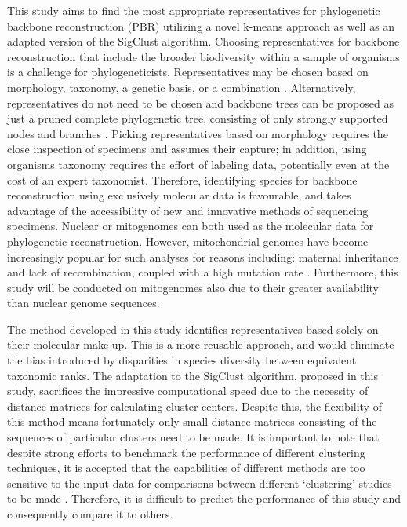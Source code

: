 \documentclass[12pt]{article}
\begin{document}
  This study aims to find the most appropriate representatives for phylogenetic backbone reconstruction (PBR) utilizing a novel k-means approach as well as an adapted version of the SigClust algorithm. Choosing representatives for backbone reconstruction that include the broader biodiversity within a sample of organisms is a challenge for phylogeneticists. Representatives may be chosen based on morphology, taxonomy, a genetic basis, or a combination \cite{orlov}. Alternatively, representatives do not need to be chosen and backbone trees can be proposed as just a pruned complete phylogenetic tree, consisting of only strongly supported nodes and branches \cite{creedy2024}. Picking representatives based on morphology requires the close inspection of specimens and assumes their capture; in addition, using organisms taxonomy requires the effort of labeling data, potentially even at the cost of an expert taxonomist. Therefore, identifying species for backbone reconstruction using exclusively molecular data is favourable, and takes advantage of the accessibility of new and innovative methods of sequencing specimens. Nuclear or mitogenomes can both used as the molecular data for phylogenetic reconstruction. However, mitochondrial genomes have become increasingly popular for such analyses for reasons including: maternal inheritance and lack of recombination, coupled with a high mutation rate \cite{YU}. Furthermore, this study will be conducted on mitogenomes also due to their greater availability than nuclear genome sequences.
  
  The method developed in this study identifies representatives based solely on their molecular make-up.  This is a more reusable approach, and would eliminate the bias introduced by disparities in species diversity between equivalent taxonomic ranks. The adaptation to the SigClust algorithm, proposed in this study, sacrifices the impressive computational speed due to the necessity of distance matrices for calculating cluster centers. Despite this, the flexibility of this method means fortunately only small distance matrices consisting of the sequences of particular clusters need to be made. It is important to note that despite strong efforts to benchmark the performance of different clustering techniques, it is accepted that the capabilities of different methods are too sensitive to the input data for comparisons between different `clustering' studies to be made \cite{Tseng2007}. Therefore, it is difficult to predict the performance of this study and consequently compare it to others.
  
\end{document}

